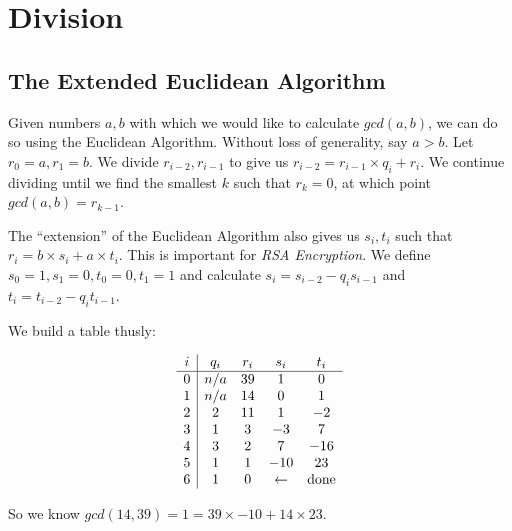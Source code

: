 \chapter{Division}

\section{The Extended Euclidean Algorithm}

Given numbers $a,b$ with which we would like to calculate $gcd(a,b)$,
we can do so using the Euclidean Algorithm.  Without loss of
generality, say $ a > b $.  Let $r_0 = a, r_1 = b$.  We divide
$r_{i-2},r_{i-1}$ to give us $r_{i-2} = r_{i-1} \times q_i + r_i$.  We
continue dividing until we find the smallest $k$ such that $r_k = 0$, at which
point $gcd(a,b) = r_{k-1}$.

The ``extension'' of the Euclidean Algorithm also gives us $s_i, t_i$
such that $ r_i = b \times s_i + a \times t_i $.  This is
important for \emph{RSA Encryption}.  We define $s_0 = 1, s_1 = 0, t_0
= 0, t_1 = 1$ and calculate $ s_i = s_{i-2} - q_is_{i-1} $ and $ t_i =
t_{i-2} - q_it_{i-1} $.

We build a table thusly:

\[
\begin{array}{ c | c c c c }
  i & q_i & r_i & s_i & t_i \\
  \hline
  0 & n/a & 39  & 1   & 0   \\
  1 & n/a & 14  & 0   & 1   \\
  2 & 2   & 11  & 1   & -2  \\
  3 & 1   & 3   & -3  & 7   \\
  4 & 3   & 2   & 7   & -16 \\
  5 & 1   & 1   & -10 & 23  \\
  6 & 1   & 0   & \leftarrow & \text{done}
\end{array}
\]  

So we know $gcd(14,39) = 1 = 39 \times -10 + 14 \times 23$.